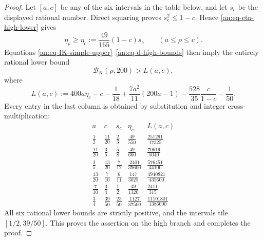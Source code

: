 \begin{proof}
Let \([a,c]\) be any of the six intervals in the table below, and let
\(s_c\) be the displayed rational number.  Direct squaring proves
\(s_c^2\leq1-c\).  Hence \eqref{an:eq-eta-high-lower} gives
\[
 \eta_\rho\geq \eta_c
 :=\frac{49}{165}(1-c)s_c
 \qquad(a\leq\rho\leq c).
\]
Equations \eqref{an:eq-IK-simple-upper}--\eqref{an:eq-d-high-bounds}
then imply the entirely rational lower bound
\begin{equation}
 \mathcal B_K(\rho,200)>L(a,c),
 \label{an:eq-BK-slab-bound}
\end{equation}
where
\[
 L(a,c):=
 400a\eta_c-c-\frac1{18}
 +\frac{7a^2}{11}(200a-1)
 -\frac{528}{35}\frac{c}{1-c}-\frac1{50}.
\]
Every entry in the last column is obtained by substitution and integer
cross-multiplication:
\[
\begin{array}{c|c|c|c|c}
 a&c&s_c&\eta_c&L(a,c)\\ \hline
 \frac12&\frac{11}{20}&\frac23&\frac{49}{550}
   &\frac{251291}{17325}\\[2pt]
 \frac{11}{20}&\frac35&\frac58&\frac{49}{660}
   &\frac{70619}{5040}\\[2pt]
 \frac35&\frac{13}{20}&\frac7{12}&\frac{2401}{39600}
   &\frac{576451}{44100}\\[2pt]
 \frac{13}{20}&\frac7{10}&\frac6{11}&\frac{147}{3025}
   &\frac{4940821}{435600}\\[2pt]
 \frac7{10}&\frac34&\frac12&\frac{49}{1320}
   &\frac{2411}{315}\\[2pt]
 \frac34&\frac{39}{50}&\frac{23}{50}&\frac{1127}{37500}
   &\frac{11101801}{1386000}
\end{array}
\]
All six rational lower bounds are strictly positive, and the intervals
tile \([1/2,39/50]\).  This proves the assertion on the high branch and
completes the proof.
\end{proof}
